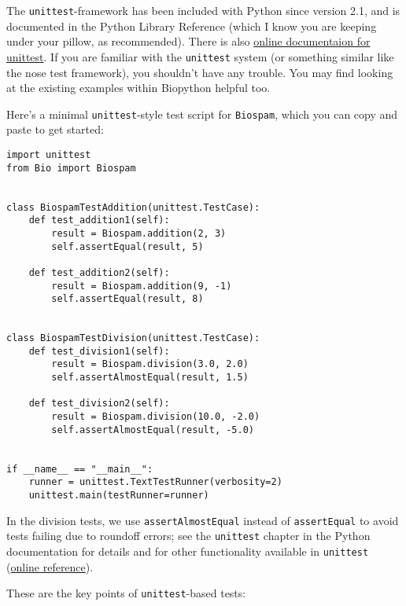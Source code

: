 The \verb|unittest|-framework has been included with Python since version
2.1, and is documented in the Python Library Reference (which I know you
are keeping under your pillow, as recommended).  There is also
\href{https://docs.python.org/3/library/unittest.html}{online documentaion
for unittest}.
If you are familiar with the \verb|unittest| system (or something similar
like the nose test framework), you shouldn't have any trouble.  You may
find looking at the existing examples within Biopython helpful too.

Here's a minimal \verb|unittest|-style test script for \verb|Biospam|,
which you can copy and paste to get started:

\begin{verbatim}
import unittest
from Bio import Biospam


class BiospamTestAddition(unittest.TestCase):
    def test_addition1(self):
        result = Biospam.addition(2, 3)
        self.assertEqual(result, 5)

    def test_addition2(self):
        result = Biospam.addition(9, -1)
        self.assertEqual(result, 8)


class BiospamTestDivision(unittest.TestCase):
    def test_division1(self):
        result = Biospam.division(3.0, 2.0)
        self.assertAlmostEqual(result, 1.5)

    def test_division2(self):
        result = Biospam.division(10.0, -2.0)
        self.assertAlmostEqual(result, -5.0)


if __name__ == "__main__":
    runner = unittest.TextTestRunner(verbosity=2)
    unittest.main(testRunner=runner)
\end{verbatim}

In the division tests, we use \verb|assertAlmostEqual| instead of \verb|assertEqual| to avoid tests failing due to roundoff errors; see the \verb|unittest| chapter in the Python documentation for details and for other functionality available in \verb|unittest| (\href{https://docs.python.org/3/library/unittest.html}{online reference}).

These are the key points of \verb|unittest|-based tests:

